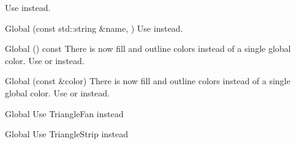 \begin{DoxyRefList}
%
Use  instead. 
\item[Global \doxylink{a01765_a0fa7ecad14206e4d5edae1d6aa87f553}{sf\+::Shader\+::set\+Parameter} (const std\+::string \&name, \doxylink{a01769}{Current\+Texture\+Type})]\label{a00650__deprecated000020}%
%
Use  instead. 
\item[Global \doxylink{a01781_a810cc4aa8eb5998f9eb9d02b1c099660}{sf\+::Text\+::get\+Color} () const]\label{a00650__deprecated000022}%
%
There is now fill and outline colors instead of a single global color. Use  or  instead. 
\item[Global \doxylink{a01781_a6ce65272d6d63ed01118366e92c68132}{sf\+::Text\+::set\+Color} (const \doxylink{a01685}{Color} \&color)]\label{a00650__deprecated000021}%
%
There is now fill and outline colors instead of a single global color. Use  or  instead. 
\item[Global \doxylink{a00652_gga5ee56ac1339984909610713096283b1ba5338a2c6d922151fe50f235036af8a20}{sf\+::Triangles\+Fan} ]\label{a00650__deprecated000008}%
%
Use Triangle\+Fan instead  
\item[Global \doxylink{a00652_gga5ee56ac1339984909610713096283b1ba66643dbbb24bbacb405973ed80eebae0}{sf\+::Triangles\+Strip} ]\label{a00650__deprecated000007}%
%
Use Triangle\+Strip instead 
\end{DoxyRefList}